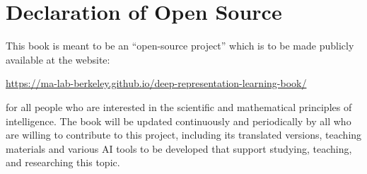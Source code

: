 \documentclass[../../book-main.tex]{subfiles}
\begin{document}
\chapter*{Declaration of Open Source}

This book is meant to be an ``open-source project'' which is to be made publicly available at the website:
\begin{center}
    \url{https://ma-lab-berkeley.github.io/deep-representation-learning-book/}
\end{center}
for all people who are interested in the scientific and mathematical principles of intelligence. The book will be updated continuously and periodically by all who are willing to contribute to this project, including its translated versions, teaching materials and various AI tools to be developed that support  studying, teaching, and researching this topic.
\end{document}
